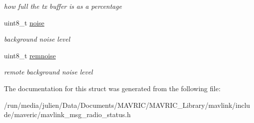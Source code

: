 \begin{DoxyCompactItemize}
\begin{DoxyCompactList}\small\item\em how full the tx buffer is as a percentage \end{DoxyCompactList}\item 
\hypertarget{struct____mavlink__radio__status__t_adfe004fd757a44f0b4cdb6c15c9a1bde}{uint8\+\_\+t \hyperlink{struct____mavlink__radio__status__t_adfe004fd757a44f0b4cdb6c15c9a1bde}{noise}}\label{struct____mavlink__radio__status__t_adfe004fd757a44f0b4cdb6c15c9a1bde}

\begin{DoxyCompactList}\small\item\em background noise level \end{DoxyCompactList}\item 
\hypertarget{struct____mavlink__radio__status__t_a8c72fbe2cc42a71933ed93aa3064f2f4}{uint8\+\_\+t \hyperlink{struct____mavlink__radio__status__t_a8c72fbe2cc42a71933ed93aa3064f2f4}{remnoise}}\label{struct____mavlink__radio__status__t_a8c72fbe2cc42a71933ed93aa3064f2f4}

\begin{DoxyCompactList}\small\item\em remote background noise level \end{DoxyCompactList}\end{DoxyCompactItemize}


The documentation for this struct was generated from the following file\+:\begin{DoxyCompactItemize}
\item 
/run/media/julien/\+Data/\+Documents/\+M\+A\+V\+R\+I\+C/\+M\+A\+V\+R\+I\+C\+\_\+\+Library/mavlink/include/maveric/mavlink\+\_\+msg\+\_\+radio\+\_\+status.\+h\end{DoxyCompactItemize}
